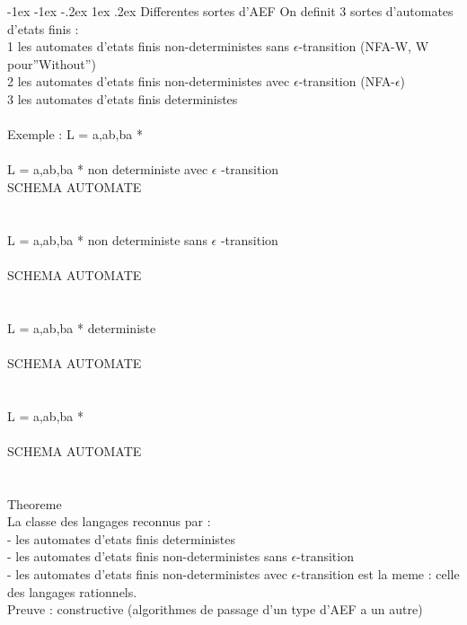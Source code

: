 \documentclass[5pt]{article}
\makeatletter
\renewcommand{\subsubsection}{\@startsection {section}{1}{\z@}%
             {-1ex \@plus -1ex \@minus -.2ex}%
             {1ex \@plus.2ex}%
             {\normalfont\scriptsize\sffamily\bfseries}}
\makeatother
\begin{document}
\begin{scriptsize}
\subsubsection{Differentes sortes d'AEF}
On definit 3 sortes d’automates d’etats finis :\\
1 les automates d’etats finis non-deterministes sans $\epsilon$-transition (NFA-W, W pour”Without”)\\
2 les automates d’etats finis non-deterministes avec $\epsilon$-transition (NFA-$\epsilon$)\\
3 les automates d’etats finis deterministes\\
\\
Exemple : L = {a,ab,ba} *\\
\\
L = {a,ab,ba} * non deterministe avec $\epsilon$ -transition
\\
SCHEMA AUTOMATE\\
\\
\\
L = {a,ab,ba} * non deterministe sans $\epsilon$ -transition\\
\\
SCHEMA AUTOMATE\\
\\
\\
L = {a,ab,ba} * deterministe\\
\\
SCHEMA AUTOMATE\\
\\
\\
L = {a,ab,ba} *\\
\\
SCHEMA AUTOMATE\\
\\
\\
Theoreme\\
La classe des langages reconnus par :\\
- les automates d’etats finis deterministes\\
- les automates d’etats finis non-deterministes sans $\epsilon$-transition\\
- les automates d’etats finis non-deterministes avec $\epsilon$-transition est la meme : celle des langages rationnels.\\
Preuve : constructive (algorithmes de passage d’un type d’AEF a un autre)\\


\end{scriptsize}
\end{document}
